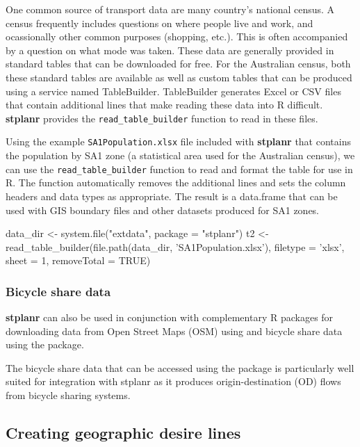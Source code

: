 One common source of transport data are many country's national census.
A census frequently includes questions on where people live and work, and ocassionally other common purposes (shopping, etc.).
This is often accompanied by a question on what mode was taken.
These data are generally provided in standard tables that can be downloaded for free.
For the Australian census, both these standard tables are available as well as custom tables that can be produced using a service named TableBuilder.
TableBuilder generates Excel or CSV files that contain additional lines that make reading these data into R difficult.
\textbf{stplanr} provides the \texttt{read\_table\_builder} function to read in these files.

Using the example \texttt{SA1Population.xlsx} file included with \textbf{stplanr} that contains the population by SA1 zone (a statistical area used for the Australian census), we can use the \texttt{read\_table\_builder} function to read and format the table for use in R.
The function automatically removes the additional lines and sets the column headers and data types as appropriate.
The result is a data.frame that can be used with GIS boundary files and other datasets produced for SA1 zones.

\begin{Schunk}
\begin{Sinput}
data_dir <- system.file("extdata", package = "stplanr")
t2 <- read_table_builder(file.path(data_dir, 'SA1Population.xlsx'),
                         filetype = 'xlsx', sheet = 1, removeTotal = TRUE)
\end{Sinput}
\end{Schunk}

\subsubsection{Bicycle share data} \label{bicycle-share-data}
\textbf{stplanr} can also be used in conjunction with complementary R packages for downloading data from Open Street Maps (OSM) using  and bicycle share data using the  package.

The bicycle share data that can be accessed using the  package is particularly well suited for integration with stplanr as it produces origin-destination (OD) flows from bicycle sharing systems.


\subsection{Creating geographic desire
lines}\label{creating-geographic-desire-lines}

